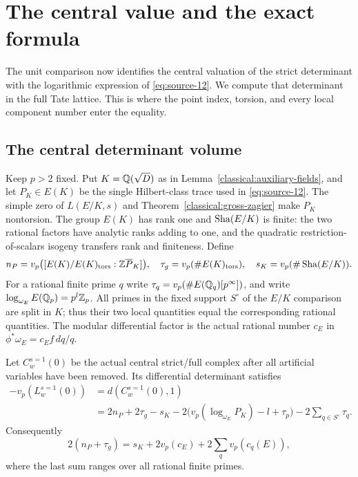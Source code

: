 \section{The central value and the exact formula}\label{sec:center}

The unit comparison now identifies the central valuation of the
strict determinant with the logarithmic expression of
\eqref{eq:source-12}.  We compute that determinant in the full Tate
lattice.  This is where the point index, torsion, and every local
component number enter the equality.

\subsection{The central determinant volume}

Keep $p>2$ fixed.  Put $K=\mathbb Q(\sqrt D)$ as in
Lemma~\ref{classical:auxiliary-fields}, and let
$P_K\in E(K)$ be the single Hilbert-class trace used in
\eqref{eq:source-12}.  The simple zero of $L(E/K,s)$ and
Theorem~\ref{classical:gross-zagier} make $P_K$ nontorsion.
The group $E(K)$ has rank one and $\operatorname{Sha}(E/K)$ is finite: the two
rational factors have analytic ranks adding to one, and the
quadratic restriction-of-scalars isogeny transfers rank and
finiteness.  Define
\[
 n_P=v_p\bigl([E(K)/E(K)_{\rm tors}:\mathbb Z\overline P_K]\bigr),
 \quad \tau_g=v_p(\#E(K)_{\rm tors}),
 \quad s_K=v_p(\#\operatorname{Sha}(E/K)).
\]
For a rational finite prime $q$ write
$\tau_q=v_p(\#E(\mathbb Q_q)[p^\infty])$, and write
$\log_{\omega_E}E(\mathbb Q_p)=p^l\mathbb Z_p$.
All primes in the fixed support $S^\circ$ of the $E/K$ comparison
are split in $K$; thus their two local quantities equal the
corresponding rational quantities.  The modular differential
factor is the actual rational number $c_E$ in
$\phi^*\omega_E=c_E f\,dq/q$.

\begin{proposition}\label{center:exact-factor}
Let $C_w^{s=1}(0)$ be the actual central strict/full complex after
all artificial variables have been removed.  Its differential
determinant satisfies
\begin{equation}
 \begin{split}
 -v_p(L_w^{s=1}(0))
 &=d(C_w^{s=1}(0),1)\\
 &=2n_P+2\tau_g-s_K
   -2\bigl(v_p(\log_{\omega_E}P_K)-l+\tau_p\bigr)
   -2\sum_{q\in S^\circ}\tau_q .
 \end{split}
 \tag{22}\label{eq:source-22}
\end{equation}
Consequently
\begin{equation}
 2(n_P+\tau_g)=s_K+2v_p(c_E)+2\sum_q v_p(c_q(E)),
 \tag{23}\label{eq:source-23}
\end{equation}
where the last sum ranges over all rational finite primes.
\end{proposition}

